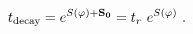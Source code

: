 \begin{equation}\label{decaytime}
t_{\rm decay} = e^{S(\varphi)+\bf S_0} = t_r \ e^{S(\varphi)}\ .
\end{equation}

